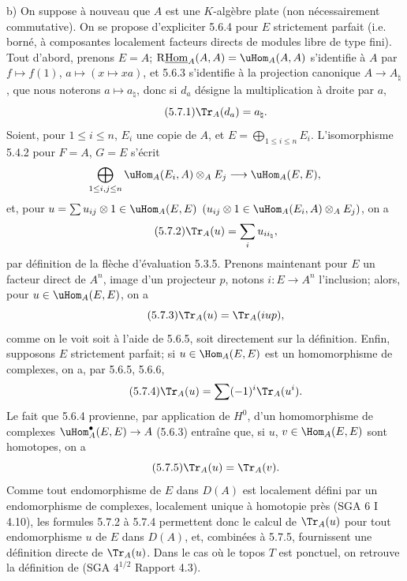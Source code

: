 b) On suppose à nouveau que $A$ est une $K$-algèbre plate (non nécessairement commutative). On se propose d'expliciter 5.6.4 pour $E$ strictement parfait (i.e. borné, à composantes localement facteurs directs de modules libre de type fini). Tout d'abord, prenons $E=A$; $\mathrm{R}\underline{\mathrm{Hom}}_A(A,A)=\uHom_A(A,A)$ s'identifie à $A$ par $f\mapsto f(1)$, $a\mapsto(x\mapsto xa)$, et 5.6.3 s'identifie à la projection canonique $A\to A_\natural$, que nous noterons $a\mapsto a_\natural$, donc si $d_a$ désigne la multiplication à droite par $a$,
\begin{equation}\tag{5.7.1}
\Tr_A(d_a)=a_\natural.
\end{equation}
Soient, pour $1\le i\le n$, $E_i$ une copie de $A$, et $E=\bigoplus_{1\le i\le n}E_i$. L'isomorphisme 5.4.2 pour $F=A$, $G=E$ s'écrit
\[
\bigoplus_{1\le i,j\le n}\uHom_A(E_i,A)\otimes_AE_j\longrightarrow\uHom_A(E,E),
\]
et, pour $u=\sum u_{ij}\otimes 1\in\uHom_A(E,E)$ $(u_{ij}\otimes 1\in\uHom_A(E_i,A)\otimes_A E_j)$, on a
\begin{equation}\tag{5.7.2}
\Tr_A(u)=\sum_i u_{ii_\natural},
\end{equation}
par définition de la flèche d'évaluation 5.3.5. Prenons maintenant pour $E$ un facteur direct de $A^n$, image d'un projecteur $p$, notons $i:E\to A^n$ l'inclusion; alors, pour $u\in\uHom_A(E,E)$, on a
\begin{equation}\tag{5.7.3}
\Tr_A(u)=\Tr_A(iup),
\end{equation}
comme on le voit soit à l'aide de 5.6.5, soit directement sur la définition. Enfin, supposons $E$ strictement parfait; si $u\in\Hom_A(E,E)$ est un homomorphisme de complexes, on a, par 5.6.5, 5.6.6,
\begin{equation}\tag{5.7.4}
\Tr_A(u)=\sum(-1)^i\Tr_A(u^i).
\end{equation}
Le
fait que 5.6.4 provienne, par application de $H^0$, d'un homomorphisme de complexes $\uHom_A^\bullet(E,E)\to A$ (5.6.3) entraîne que, si $u$, $v\in\Hom_A(E,E)$ sont homotopes, on a
\begin{equation}\tag{5.7.5}
\Tr_A(u)=\Tr_A(v).
\end{equation}
Comme tout endomorphisme de $E$ dans $D(A)$ est localement défini par un endomorphisme de complexes, localement unique à homotopie près (SGA 6 I 4.10), les formules 5.7.2 à 5.7.4 permettent donc le calcul de $\Tr_A(u)$ pour tout endomorphisme $u$ de $E$ dans $D(A)$, et, combinées à 5.7.5, fournissent une définition directe de $\Tr_A(u)$. Dans le cas où le topos $T$ est ponctuel, on retrouve la définition de (SGA $4^{1/2}$ Rapport 4.3).

